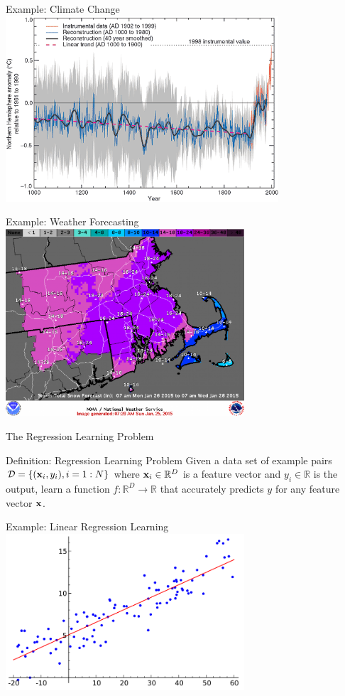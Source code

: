 \documentclass[serif,xcolor=pdftex,dvipsnames,table,hyperref={bookmarks=false,breaklinks}]{beamer}
\begin{document}
\begin{frame}[t]{Example: Climate Change}
\center
\includegraphics[width=4in]{../Figures/northern-hemisphere-temperature.png}
\end{frame}

\begin{frame}[t]{Example: Weather Forecasting}
\center
\includegraphics[width=3.5in]{../Figures/weather-forecast.png}
\end{frame}

\begin{frame}[t]{The Regression Learning Problem}
\begin{block}{Definition: Regression Learning Problem}
Given a data set of example pairs $\mathcal{D}=\{({\mathbf{x}}_i,y_i),i=1:N\}$ where ${\mathbf{x}}_i\in\mathbb{R}^D$ is a feature vector and $y_i\in \mathbb{R}$ is the output, learn a function $f:\mathbb{R}^D\rightarrow \mathbb{R}$ that accurately predicts $y$ for any feature vector ${\mathbf{x}}$.
\end{block}
\end{frame}

\begin{frame}[t]{Example: Linear Regression Learning}
\center
\includegraphics[width=3.5in]{../Figures/regression-learning-example.png}
\end{frame}
\end{document}
